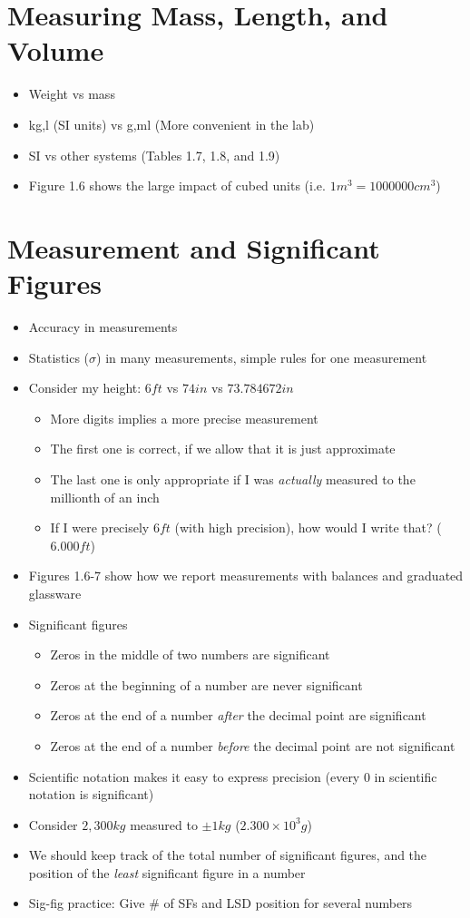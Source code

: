 \documentclass[12pt, openany, letterpaper]{memoir}
\begin{document}
\section{Measuring Mass, Length, and Volume}
\begin{itemize}
	\item Weight vs mass
	\item kg,l (SI units) vs g,ml (More convenient in the lab)
	\item SI vs other systems (Tables 1.7, 1.8, and 1.9)
	\item Figure 1.6 shows the large impact of cubed units (i.e. $1m^3 = 1000000cm^3$)
\end{itemize}

\section{Measurement and Significant Figures}
\begin{itemize}
	\item Accuracy in measurements
	\item Statistics ($\sigma$) in many measurements, simple rules for one measurement
	\item Consider my height: $6ft$ vs $74in$ vs $73.784672in$
	      \begin{itemize}
		      \item More digits implies a more precise measurement
		      \item The first one is correct, if we allow that it is just approximate
		      \item The last one is only appropriate if I was \emph{actually} measured to the millionth of an inch
		      \item If I were precisely $6ft$ (with high precision), how would I write that? ($6.000ft$)
	      \end{itemize}
	\item Figures 1.6-7 show how we report measurements with balances and graduated glassware
	\item Significant figures
	      \begin{itemize}
		      \item Zeros in the middle of two numbers are significant
		      \item Zeros at the beginning of a number are never significant
		      \item Zeros at the end of a number \emph{after} the decimal point are significant
		      \item Zeros at the end of a number \emph{before} the decimal point are not significant
	      \end{itemize}
	\item Scientific notation makes it easy to express precision (every $0$ in scientific notation is significant)
	\item Consider $2,300kg$ measured to $\pm1kg$ ($2.300\times10^3g$)
	\item We should keep track of the total number of significant figures, and the position of the \emph{least} significant figure in a number
	\item Sig-fig practice: Give \# of SFs and LSD position for several numbers
\end{itemize}
\end{document}
